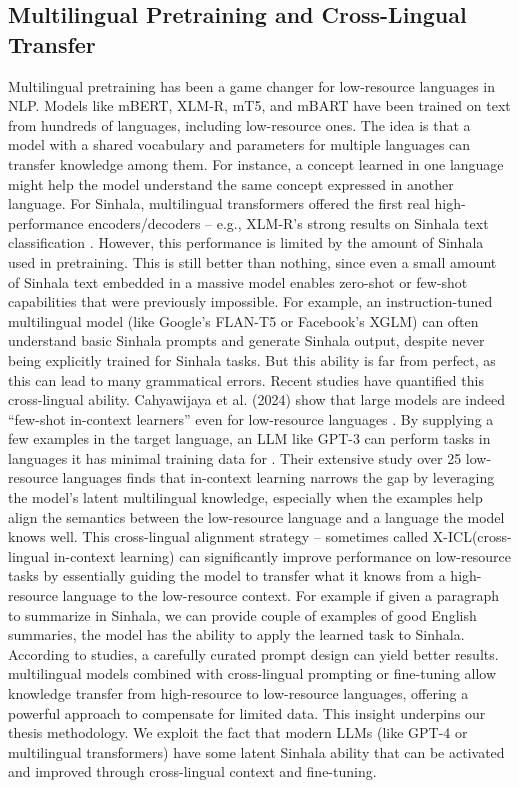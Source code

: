 \documentclass[12pt]{uomthesis}
\begin{document}
\subsection{Multilingual Pretraining and Cross-Lingual Transfer}
Multilingual pretraining has been a game changer for low-resource languages in NLP. Models like mBERT, XLM-R, mT5, and mBART have been trained on text from hundreds of languages, including low-resource ones. The idea is that a model with a shared vocabulary and parameters for multiple languages can transfer knowledge among them. For instance, a concept learned in one language might help the model understand the same concept expressed in another language. For Sinhala, multilingual transformers offered the first real high-performance encoders/decoders – e.g., XLM-R’s strong results on Sinhala text classification \cite{2}. However, this performance is limited by the amount of Sinhala used in pretraining. This is still better than nothing, since even a small amount of Sinhala text embedded in a massive model enables zero-shot or few-shot capabilities that were previously impossible. For example, an instruction-tuned multilingual model (like Google’s FLAN-T5 or Facebook’s XGLM) can often understand basic Sinhala prompts and generate Sinhala output, despite never being explicitly trained for Sinhala tasks. But this ability is far from perfect, as this can lead to many grammatical errors. Recent studies have quantified this cross-lingual ability. Cahyawijaya et al. (2024) show that large models are indeed “few-shot in-context learners” even for low-resource languages \cite{2}. By supplying a few examples in the target language, an LLM like GPT-3 can perform tasks in languages it has minimal training data for \cite{17}. Their extensive study over 25 low-resource languages finds that in-context learning narrows the gap by leveraging the model’s latent multilingual knowledge, especially when the examples help align the semantics between the low-resource language and a language the model knows well.
This cross-lingual alignment strategy – sometimes called X-ICL(cross-lingual in-context learning) \cite{20} can significantly improve performance on low-resource tasks by essentially guiding the model to transfer what it knows from a high-resource language to the low-resource context. For example if given a paragraph to summarize in Sinhala, we can provide couple of examples of good English summaries, the model has the ability to apply the learned task to Sinhala. According to studies, a carefully curated prompt design can yield better results.
multilingual models combined with cross-lingual prompting or fine-tuning allow knowledge transfer from high-resource to low-resource languages, offering a powerful approach to compensate for limited data. This insight underpins our thesis methodology. We exploit the fact that modern LLMs (like GPT-4 or multilingual transformers) have some latent Sinhala ability that can be activated and improved through cross-lingual context and fine-tuning.
\end{document}
